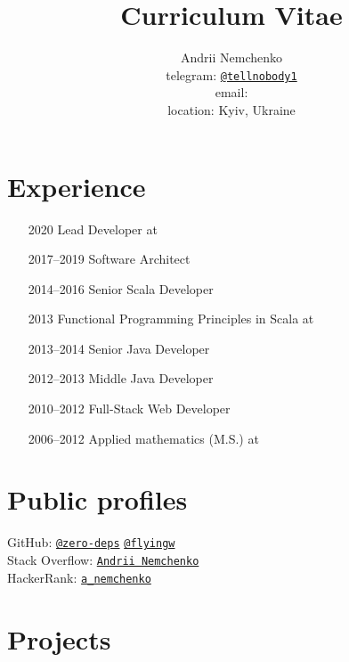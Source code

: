 

\title{Curriculum Vitae}
\author{
  Andrii Nemchenko\\
  telegram: \href{https://t.me/tellnobody1}{\nolinkurl{@tellnobody1}}\\
  email: \\
  location: Kyiv, Ukraine
}
\maketitle

\section{Experience}
\begin{itemize}
  \item[2020] Lead Developer at 
  \item[2017–2019] Software Architect
  \item[2014–2016] Senior Scala Developer
  \item[2013] Functional Programming Principles in Scala at 
  \item[2013–2014] Senior Java Developer
  \item[2012–2013] Middle Java Developer
  \item[2010–2012] Full-Stack Web Developer
  \item[2006–2012] Applied mathematics (M.S.) at 
\end{itemize}

\section{Public profiles}
GitHub:
\href{https://github.com/zero-deps}{\nolinkurl{@zero-deps}}
\href{https://github.com/flyingw}{\nolinkurl{@flyingw}} \\
Stack Overflow:
\href{https://stackoverflow.com/users/355491}{\nolinkurl{Andrii Nemchenko}} \\
HackerRank:
\href{https://www.hackerrank.com/a\_nemchenko}{\nolinkurl{a\_nemchenko}}

\pagebreak

\section{Projects}
